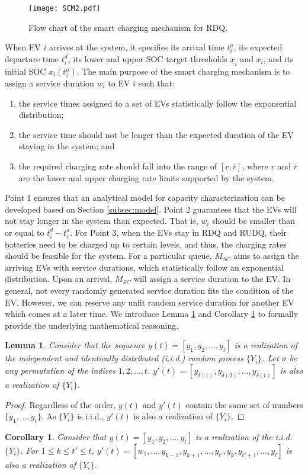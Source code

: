 \documentclass[journal]{IEEEtran}
\newtheorem{lemma}{\textbf{Lemma}}
\newtheorem{corollary}{\textbf{Corollary}}
\begin{document}
\begin{figure}[!t]
\centering
\texttt{[image: SCM2.pdf]} 
\caption{Flow chart of the smart charging mechanism for RDQ.}
\label{fig:scm}
\end{figure}
When EV $i$ arrives at the system, it specifies its arrival time $t_i^a$, its expected departure time $t_i^d$, its lower and upper SOC target thresholds $\underline{x}_i$ and $\overline{x}_i$, and its initial SOC $x_i(t_i^a)$.
The main purpose of the smart charging mechanism is to assign a service
duration $w_i$ to EV $i$ such that:
\begin{enumerate}
\item the service times assigned to a set of EVs statistically follow the exponential distribution;
\item the service time should not be longer than the expected duration of the
EV staying in the system; and
\item the required charging rate should fall into the range of $[\underline{r},\overline{r}]$, where $\underline{r}$ and $\overline{r}$ are the lower and upper charging rate limits supported by the system.
\end{enumerate}
Point 1 ensures that an analytical model for capacity characterization can be developed based on Section \ref{subsec:model}. Point 2 guarantees that the EVs will not stay longer in the system than expected.  That is, $w_i$ should be smaller than or equal to $t_i^d-t_i^a$. For Point 3, when the EVs stay in RDQ and RUDQ, their batteries need to be charged up to certain levels, and thus, the charging rates should be feasible for the system.
For a particular queue, $M_{SC}$ aims to assign the arriving EVs with service durations, which statistically follow an exponential distribution. Upon an arrival, $M_{SC}$ will assign a service duration to the EV. In general, not every randomly generated service duration fits the condition of the EV. However, we can reserve any unfit random service duration for another EV which comes at a later time. We introduce Lemma \ref{lemma:permutation} and Corollary \ref{col:realization} to formally provide the underlying mathematical reasoning.
\begin{lemma} \label{lemma:permutation}
Consider that the sequence $y(t)=[y_1, y_2,\ldots,y_t]$ is a realization of the independent and identically distributed (i.i.d.) random process $\{Y_i\}$. Let $\sigma$ be any permutation of the indices $1, 2, \ldots, t$. $y'(t)=[y_{\delta(1)}, y_{\delta(2)}, \ldots,y_{\delta(t)}]$ is also a realization of $\{Y_i\}$.
\end{lemma}
\begin{proof}
Regardless of the order, $y(t)$ and $y'(t)$ contain the same set of numbers $\{y_1,\ldots,y_t\}$. As $\{Y_i\}$ is i.i.d., $y'(t)$ is also a realization of $\{Y_i\}$.
\end{proof}
\begin{corollary} \label{col:realization}
Consider that $y(t)=[y_1, y_2,\ldots,y_t]$ is a realization of the i.i.d. $\{Y_i\}$.
For $1\leq k\leq t'\leq t$, $y'(t)=[w_1, \ldots,y_{k-1},y_{k+1},\ldots,y_{t'},y_k,y_{t'+1},\ldots,y_{t}]$ is also a realization of $\{Y_i\}$.
\end{corollary}
\end{document}
